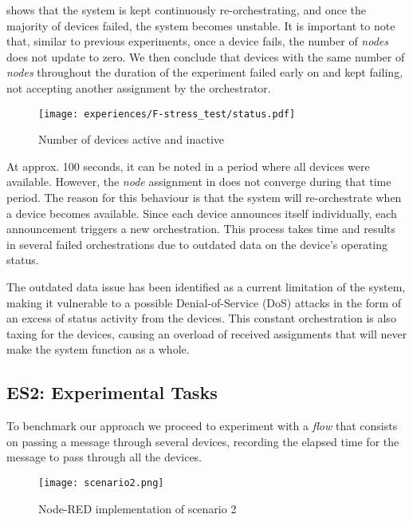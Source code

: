  shows that the system is kept continuously re-orchestrating, and once the majority of devices failed, the system becomes unstable. It is important to note that, similar to previous experiments, once a device fails, the number of \textit{nodes} does not update to zero. We then conclude that devices with the same number of \textit{nodes} throughout the duration of the experiment failed early on and kept failing, not accepting another assignment by the orchestrator.

\begin{figure}[H]
\centering
\texttt{[image: experiences/F-stress\_test/status.pdf]}
\caption[Number of devices active and inactive]{Number of devices active and inactive}\label{fig:stress_test_status}
\end{figure}

At approx. 100 seconds, it can be noted in  a period where all devices were available. However, the \textit{node} assignment in  does not converge during that time period. The reason for this behaviour is that the system will re-orchestrate when a device becomes available. Since each device announces itself individually, each announcement triggers a new orchestration. This process takes time and results in several failed orchestrations due to outdated data on the device's operating status. 

The outdated data issue has been identified as a current limitation of the system, making it vulnerable to a possible Denial-of-Service (DoS) attacks in the form of an excess of status activity from the devices. This constant orchestration is also taxing for the devices, causing an overload of received assignments that will never make the system function as a whole.


\subsection{ES2: Experimental Tasks}\label{sec:discussion_scenario2}

To benchmark our approach we proceed to experiment with a \textit{flow} that consists on passing a message through several devices, recording the elapsed time for the message to pass through all the devices.

\begin{figure}[h]
\centering
\texttt{[image: scenario2.png]}
\caption[Node-RED implementation of scenario 2]{Node-RED implementation of scenario 2}\label{fig:scenario2_node_red}
\end{figure}


